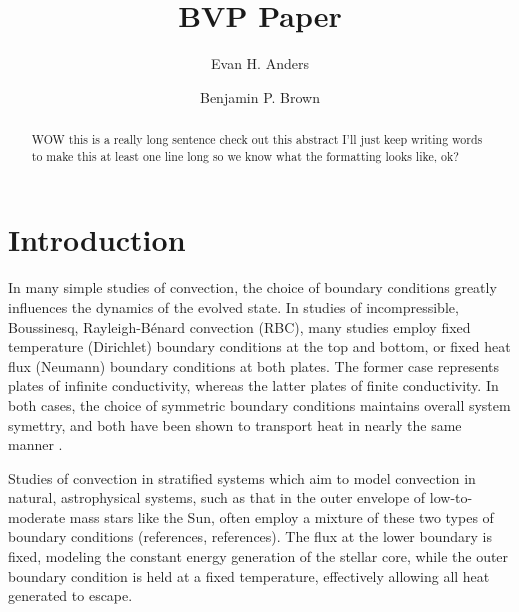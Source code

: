 \documentclass[aps, pre, onecolumn, nofootinbib, notitlepage, groupedaddress, amsfonts, amssymb, amsmath, longbibliography]{revtex4-1}
\newcommand{\RB}{Rayleigh-B\'{e}nard }
\begin{document}
\author{Evan H. Anders}
\author{Benjamin P. Brown}
\title{BVP Paper}

\begin{abstract}
WOW this is a really long sentence check out this abstract I'll just keep writing words to make this at least
one line long so we know what the formatting looks like, ok?
\end{abstract}
\maketitle


\section{Introduction}
\label{sec:intro}
In many simple studies of convection, the choice of boundary conditions greatly influences the dynamics
of the evolved state.  In studies of incompressible, Boussinesq, \RB convection (RBC), many studies
employ fixed temperature (Dirichlet) boundary conditions at the top and bottom, or fixed heat flux
(Neumann) boundary conditions at both plates.  The former case represents plates of infinite conductivity,
whereas the latter plates of finite conductivity.  In both cases, the choice of symmetric boundary
conditions maintains overall system symettry, and both have been shown to transport heat in nearly the
same manner \cite{johnston&doering2009}.

Studies of convection in stratified systems which aim to model convection in natural, astrophysical systems,
such as that in the outer envelope of low-to-moderate mass stars like the Sun, often employ a mixture of these
two types of boundary conditions (references, references).  The flux at the lower boundary is fixed, modeling
the constant energy generation of the stellar core, while the outer boundary condition is held at a fixed temperature,
effectively allowing all heat generated to escape.  
\end{document}
